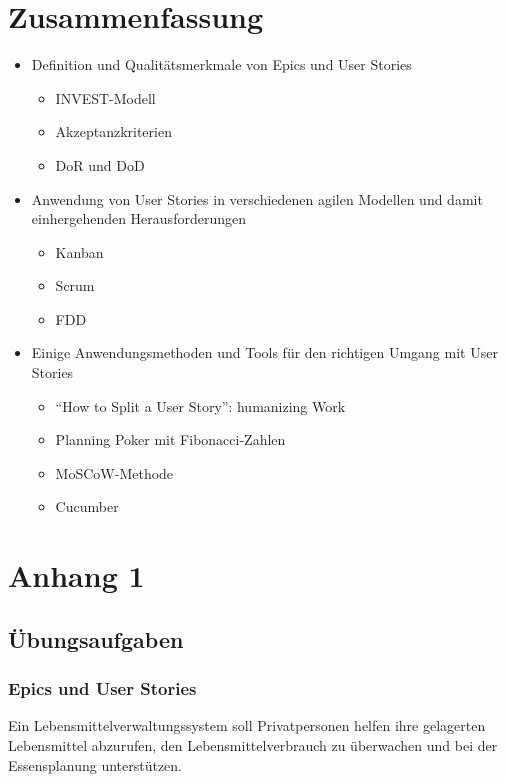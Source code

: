 \documentclass[acmtog]{acmart}
\begin{document}
\section{Zusammenfassung}

\begin{itemize}
\item Definition und Qualitätsmerkmale von Epics und User Stories
  \begin{itemize}
  \item INVEST-Modell
  \item Akzeptanzkriterien
  \item DoR und DoD
  \end{itemize}
\item Anwendung von User Stories in verschiedenen agilen Modellen und damit einhergehenden Herausforderungen
  \begin{itemize}
  \item Kanban
  \item Scrum
  \item FDD
  \end{itemize}
\item Einige Anwendungsmethoden und Tools für den richtigen Umgang mit User Stories
  \begin{itemize}
  \item ``How to Split a User Story'': humanizing Work
  \item Planning Poker mit Fibonacci-Zahlen
  \item MoSCoW-Methode
  \item Cucumber
  \end{itemize}
\end{itemize}





\appendix

\section{Anhang 1}

\subsection{Übungsaufgaben}
\subsubsection{Epics und User Stories}\label{aufg:epics-und-user-stories}
Ein Lebensmittelverwaltungssystem soll Privatpersonen helfen ihre gelagerten Lebensmittel abzurufen,
den Lebensmittelverbrauch zu überwachen und bei der Essensplanung unterstützen.
\end{document}
